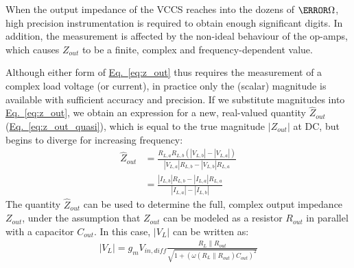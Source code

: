 \documentclass[conference]{IEEEtran}
\newcommand{\briefeqlink}[1]{\hyperref[#1]{Eq.~\ref*{#1}}\xspace }
\begin{document}
When the output impedance of the VCCS reaches into the dozens of $\mega\ohm$, high precision instrumentation is required to obtain enough significant digits. In addition, the measurement is affected by the non-ideal behaviour of the op-amps, which causes $Z_{out}$ to be a finite, complex and frequency-dependent value.

Although either form of \briefeqlink{eq:z_out} thus requires the measurement of a complex load voltage (or current), in practice only the (scalar) magnitude is available with sufficient accuracy and precision. If we substitute magnitudes into \briefeqlink{eq:z_out}, we obtain an expression for a new, real-valued quantity $\hat{Z}_{out}$ (\briefeqlink{eq:z_out_quasi}), which is equal to the true magnitude $|Z_{out}|$ at DC, but begins to diverge for increasing frequency:
\begin{subequations}
\label{eq:z_out_quasi}
\begin{align}
\hat{Z}_{out} &= \frac{R_{L,a} R_{L,b} (|V_{L,b}| - |V_{L,a}|)} {|V_{L,a}|R_{L,b} - |V_{L,b}| R_{L,a}} \label{eq:z_out_quasi_volt} \\
&= \frac{|I_{L,b}| R_{L,b} - |I_{L,a}| R_{L,a}} {|I_{L,a}| - |I_{L,b}|} \label{eq:z_out_quasi_curr}
\end{align}
\end{subequations}
The quantity $\hat{Z}_{out}$ can be used to determine the full, complex output impedance $Z_{out}$, under the assumption that $Z_{out}$ can be modeled as a resistor $R_{out}$ in parallel with a capacitor $C_{out}$. In this case, $|V_L|$ can be written as:
\begin{align}
|V_L| = g_m V_{in,dif\!f}\frac{R_L\|R_{out}} {\sqrt{1 + (\omega (R_L\|R_{out}) C_{out})^2}} \label{eq:v_l_for_ref_circuit}
\end{align}
\end{document}
